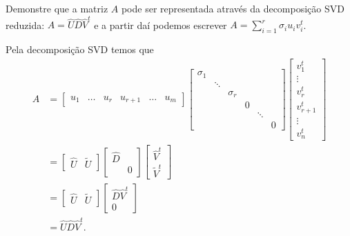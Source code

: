 \begin{questions}
    \question Demonstre que a matriz $A$ pode ser representada atrav\'{e}s da decomposi\c{c}\~{a}o SVD reduzida: $A = \hat{U} \hat{D} \hat{V}^t$ e a partir da\'{i} podemos escrever $A = \sum_{i = 1}^r \sigma_i u_i v_i^t$.
    \begin{solution}
        Pela decomposi\c{c}\~{a}o SVD temos que
        \begin{align*}
            A &= \begin{bmatrix}
                u_1 & \ldots & u_r & u_{r + 1} & \ldots & u_m
            \end{bmatrix} \begin{bmatrix}
                \sigma_1 \\
                & \ddots \\
                & & \sigma_r \\
                & & & 0 \\
                & & & & \ddots \\
                & & & & & 0
            \end{bmatrix} \begin{bmatrix}
                v_1^t \\
                \vdots \\
                v_r^t \\
                v_{r + 1}^t \\
                \vdots \\
                v_n^t
            \end{bmatrix} \\
            &= \begin{bmatrix}
                \hat{U} & \tilde{U}
            \end{bmatrix} \begin{bmatrix}
                \hat{D} & \\
                & 0
            \end{bmatrix} \begin{bmatrix}
                \hat{V}^t \\
                \tilde{V}^t
            \end{bmatrix} \\
            &= \begin{bmatrix}
                \hat{U} & \tilde{U}
            \end{bmatrix} \begin{bmatrix}
                \hat{D} \hat{V}^t \\
                0
            \end{bmatrix} \\
            &= \hat{U} \hat{D} \hat{V}^t.
        \end{align*}


\end{solution}
\end{questions}
